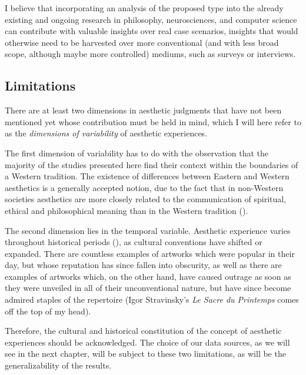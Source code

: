 I believe that incorporating an analysis of the proposed type into the already existing and ongoing research in philosophy, neurosci\-ences, and computer science can contribute with valuable insights over real case scenarios, insights that would otherwise need to be harvested over more conventional (and with less broad scope, although maybe more controlled) mediums, such as surveys or interviews.

\subsection{Limitations}\label{subsec:limits}
There are at least two dimensions in aesthetic judgments that have not been mentioned yet whose contribution must be held in mind, which I will here refer to as the \emph{dimensions of variability} of aesthetic experiences.

The first dimension of variability has to do with the observation that the majority of the studies presented here find their context within the boundaries of a Western tradition. The existence of differences between Eastern and Western aesthetics is a generally accepted notion, due to the fact that in non-Western societies aesthetics are more closely related to the communication of spiritual, ethical and philosophical meaning than in the Western tradition (\cite{anderson1989comparative}).

The second dimension lies in the temporal variable. Aesthetic experience varies throughout historical periods (\cite{pearce2016neuroaesthetics}), as cultural conventions have shifted or expanded. There are countless examples of artworks which
were popular in their day, but whose reputation has since fallen into obscurity, as well as there are examples of artworks which, on the other hand, have caused outrage  as soon as they were unveiled in all of their unconventional nature, but have since become admired staples of the repertoire (Igor Stravinsky's \emph{Le Sacre du Printemps} comes off the top of my head).

Therefore, the cultural and historical constitution of the concept of aesthetic experiences should be acknowledged. The choice of our data sources, as we will see in the next chapter, will be subject to these two limitations, as will be the generalizability of the results.

